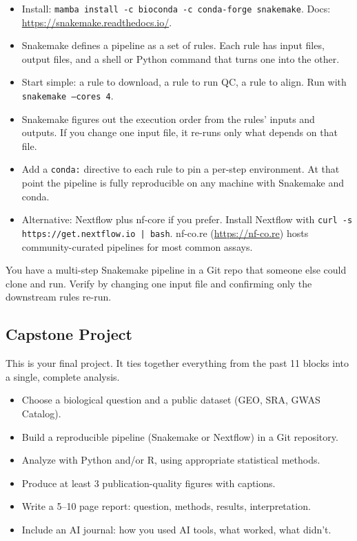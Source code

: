 \begin{itemize}[nosep]
  \item Install: \texttt{mamba install -c bioconda -c conda-forge snakemake}. Docs: \url{https://snakemake.readthedocs.io/}.
  \item Snakemake defines a pipeline as a set of rules. Each rule has input files, output files, and a shell or Python command that turns one into the other.
  \item Start simple: a rule to download, a rule to run QC, a rule to align. Run with \texttt{snakemake --cores 4}.
  \item Snakemake figures out the execution order from the rules' inputs and outputs. If you change one input file, it re-runs only what depends on that file.
  \item Add a \texttt{conda:} directive to each rule to pin a per-step environment. At that point the pipeline is fully reproducible on any machine with Snakemake and conda.
  \item Alternative: Nextflow plus nf-core if you prefer. Install Nextflow with \texttt{curl -s https://get.nextflow.io | bash}. nf-co.re (\url{https://nf-co.re}) hosts community-curated pipelines for most common assays.
\end{itemize}
\begin{winbox}[Checkpoint]
You have a multi-step Snakemake pipeline in a Git repo that someone else could clone and run. Verify by changing one input file and confirming only the downstream rules re-run.
\end{winbox}

\subsection{Capstone Project}

This is your final project. It ties together everything from the past 11 blocks into a single, complete analysis.

\begin{dobox}
\begin{itemize}[nosep]
  \item Choose a biological question and a public dataset (GEO, SRA, GWAS Catalog).
  \item Build a reproducible pipeline (Snakemake or Nextflow) in a Git repository.
  \item Analyze with Python and/or R, using appropriate statistical methods.
  \item Produce at least 3 publication-quality figures with captions.
  \item Write a 5--10 page report: question, methods, results, interpretation.
  \item Include an AI journal: how you used AI tools, what worked, what didn't.
\end{itemize}
\end{dobox}

